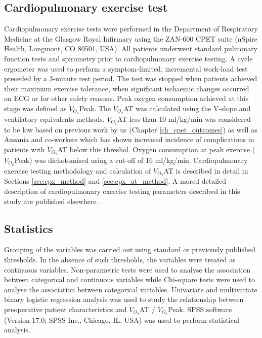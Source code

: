 \subsection{Cardiopulmonary exercise test}
Cardiopulmonary exercise tests were performed in the Department of Respiratory Medicine at the Glasgow Royal Infirmary using the ZAN-600 CPET suite (nSpire Health, Longmont, CO 80501, USA). 
All patients underwent standard pulmonary function tests and spirometry prior to cardiopulmonary exercise testing. 
A cycle ergometer was used to perform a symptom-limited, incremental work-load test preceded by a 3-minute rest period. 
The test was stopped when patients achieved their maximum exercise tolerance, when significant ischaemic changes occurred on ECG or for other safety reasons. 
Peak oxygen consumption achieved at this stage was defined as $\dot{V}_{O_2}$Peak. 
The $\dot{V}_{O_2}$AT was calculated using the V-slope \parencite{beaver_new_1986,sue_metabolic_1988} and ventilatory equivalents \parencite{society_ats/accp_2003} methods.
$\dot{V}_{O_2}$AT less than 10 ml/kg/min was considered to be low based on previous work by us (Chapter \ref{ch_cpet_outcomes}) as well as Ausania and co-workers \parencite{ausania_effects_2012} which has shown increased incidence of complications in patients with $\dot{V}_{O_2}$AT below this threshol. 
Oxygen consumption at peak exercise ($\dot{V}_{O_2}$Peak) was dichotomised using a cut-off of 16 ml/kg/min. 
Cardiopulmonary exercise testing methodology and calculation of $\dot{V}_{O_2}$AT is described in detail in Sections \ref{sec:cpx_method} and \ref{sec:cpx_at_method}.
A mored detailed description of cardiopulmonary exercise testing parameters described in this study are published elsewhere \parencite{balady_clinicians_2010}.

\subsection{Statistics}
Grouping of the variables was carried out using standard or previously published thresholds. 
In the absence of such thresholds, the variables were treated as continuous variables. 
Non-parametric tests were used to analyse the association between categorical and continuous variables while Chi-square tests were used to analyse the association between categorical variables. 
Univariate and multivariate binary logistic regression analysis was used to study the relationship between preoperative patient characteristics and $\dot{V}_{O_2}$AT / $\dot{V}_{O_2}$Peak. 
SPSS software (Version 17.0; SPSS Inc., Chicago, IL, USA) was used to perform statistical analysis.

